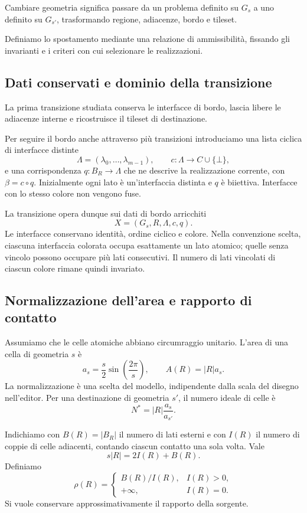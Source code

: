 \documentclass[11pt,a4paper]{article}
\newcommand{\Wild}{\bot}
\begin{document}
Cambiare geometria significa passare da un problema definito su $G_s$ a uno definito su $G_{s'}$, trasformando regione, adiacenze, bordo e tileset.

Definiamo lo spostamento mediante una relazione di ammissibilità, fissando gli invarianti e i criteri con cui selezionare le realizzazioni.

\subsection{Dati conservati e dominio della transizione}

La prima transizione studiata conserva le interfacce di bordo, lascia libere le adiacenze interne e ricostruisce il tileset di destinazione.

Per seguire il bordo anche attraverso più transizioni introduciamo una lista ciclica di interfacce distinte
\[
\Lambda=(\lambda_0,\ldots,\lambda_{m-1}),
\qquad c:\Lambda\to C\cup\{\Wild\},
\]
e una corrispondenza $q:B_R\to\Lambda$ che ne descrive la realizzazione corrente, con $\beta=c\circ q$. Inizialmente ogni lato è un'interfaccia distinta e $q$ è biiettiva. Interfacce con lo stesso colore non vengono fuse.

La transizione opera dunque sui dati di bordo arricchiti
\[
X=(G_s,R,\Lambda,c,q).
\]
Le interfacce conservano identità, ordine ciclico e colore. Nella convenzione scelta, ciascuna interfaccia colorata occupa esattamente un lato atomico; quelle senza vincolo possono occupare più lati consecutivi. Il numero di lati vincolati di ciascun colore rimane quindi invariato.

\subsection{Normalizzazione dell'area e rapporto di contatto}

Assumiamo che le celle atomiche abbiano circumraggio unitario. L'area di una cella di geometria $s$ è
\[
a_s=\frac{s}{2}\sin\left(\frac{2\pi}{s}\right),
\qquad A(R)=|R|a_s.
\]
La normalizzazione è una scelta del modello, indipendente dalla scala del disegno nell'editor. Per una destinazione di geometria $s'$, il numero ideale di celle è
\[
N^*=|R|\frac{a_s}{a_{s'}}.
\]

Indichiamo con $B(R)=|B_R|$ il numero di lati esterni e con $I(R)$ il numero di coppie di celle adiacenti, contando ciascun contatto una sola volta. Vale
\[
s|R|=2I(R)+B(R).
\]
Definiamo
\[
\rho(R)=\begin{cases}B(R)/I(R),&I(R)>0,\\+\infty,&I(R)=0.\end{cases}
\]
Si vuole conservare approssimativamente il rapporto della sorgente.
\end{document}
